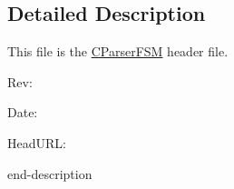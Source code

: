 \subsection{Detailed Description}
This file is the \hyperlink{struct_c_parser_f_s_m}{CParserFSM} header file. \begin{DoxyParagraph}{Rev:}

\end{DoxyParagraph}
\begin{DoxyParagraph}{Date:}

\end{DoxyParagraph}
\begin{DoxyParagraph}{HeadURL:}

\end{DoxyParagraph}


end-\/description 